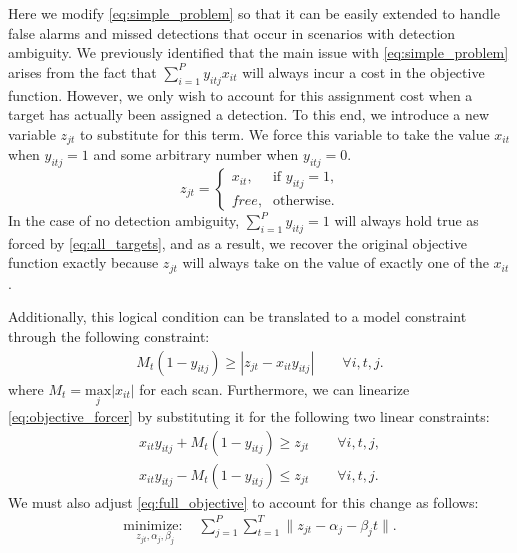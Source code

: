 Here we modify \eqref{eq:simple_problem} so that it can be easily extended to handle false alarms and missed detections that occur in scenarios with detection ambiguity. We previously identified that the main issue with \eqref{eq:simple_problem} arises from the fact that $\sum_{i=1}^{P}y_{itj}x_{it}$ will always incur a cost in the objective function. However, we only wish to account for this assignment cost when a target has actually been assigned a detection. To this end, we introduce a new variable $z_{jt}$ to substitute for this term. We force this variable to take the value $x_{it}$ when $y_{itj}=1$ and some arbitrary number when $y_{itj}=0$. 
\[z_{jt} =
\begin{cases}
x_{it}, & \text{if $y_{itj} = 1$,} \\
\textit{free}, & \text{otherwise.}
\end{cases}\]
In the case of no detection ambiguity, $\sum_{i=1}^{P} y_{itj} = 1$ will always hold true as forced by \eqref{eq:all_targets}, and as a result, we recover the original objective function exactly because $z_{jt}$ will always take on the value of exactly one of the $x_{it}$.

Additionally, this logical condition can be translated to a model constraint through the following constraint:
\begin{align}\label{eq:objective_forcer}
M_{t}(1-y_{itj}) \geq |z_{jt} - x_{it}y_{itj}| \qquad \forall i,t,j.
\end{align}
where $M_{t} = \underset{j}{\text{max}}|x_{it}|$ for each scan. Furthermore, we can linearize \eqref{eq:objective_forcer} by substituting it for the following two linear constraints:
\begin{align*}
x_{it}y_{itj} + M_{t}(1-y_{itj}) \geq z_{jt} \qquad \forall i,t,j,\\
x_{it}y_{itj} - M_{t}(1-y_{itj}) \leq z_{jt} \qquad \forall i,t,j.
\end{align*}
We must also adjust \eqref{eq:full_objective} to account for this change as follows:
\begin{align}\label{eq:generalized_objective}
\underset{z_{jt}, \alpha_{j}, \beta_{j}}{\text{minimize: }} & \sum_{j=1}^{P} \sum_{t=1}^{T} \|z_{jt} - \alpha_{j} - \beta_{j}t\|.
\end{align}


